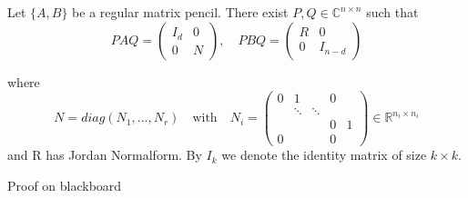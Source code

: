 	\begin{frame}
		\begin{theorem}%
			\label{Kronecker-Normalform}
			Let $\{ A,B \}$ be a regular matrix pencil. There exist $P,Q \in \mathbb{C}^{n \times n}$ such that
			\begin{displaymath}
				PAQ = 
				\left(
				\begin{matrix}
					I_d & 0 \\
					0 & N 
				\end{matrix}
				\right), \quad
				PBQ = 
				\left(
				\begin{matrix}
					R & 0 \\
					0 & I_{n-d}
				\end{matrix}
				\right)
			\end{displaymath}
			
			where
			\begin{displaymath}
				N = diag(N_1, ..., N_r) \quad \text{with} \quad N_i = 
				\left(
				\begin{matrix}
					0 & 1 & & 0\\
					& \ddots &\ddots & \\
					& & & 0 & 1 \\
					0 & & & 0
				\end{matrix}
				\right)
				\in \mathbb{R}^{n_i \times n_i}
			\end{displaymath}
			and R has Jordan Normalform. By $I_k$ we denote the identity matrix of size $k \times k$.
		\end{theorem}
		Proof on blackboard
	\end{frame}
	
